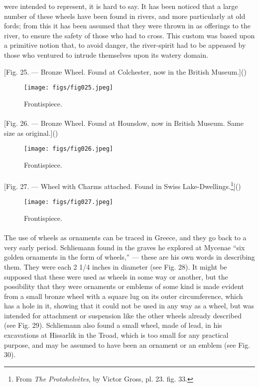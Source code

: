 \documentclass[a4paper, 11pt, oneside, polutonikogreek, english]{article}
\begin{document}
were intended to represent, it is hard to say. It has been noticed that a large number of these wheels have been found in rivers, and more particularly at old fords; from this it has been assumed that they were thrown in as offerings to the river, to ensure the safety of those who had to cross. This custom was based upon a primitive notion that, to avoid danger, the river-spirit had to be appeased by those who ventured to intrude themselves upon its watery domain.

[Fig. 25. --- Bronze Wheel. Found at Colchester, now in the British Museum.]()
\begin{figure}[H]
\centering
\texttt{[image: figs/fig025.jpeg]}
\caption{Frontispiece.}
\end{figure}
\paragraph{}
[Fig. 26. --- Bronze Wheel. Found at Hounslow, now in British Museum. Same size as original.]()
\begin{figure}[H]
\centering
\texttt{[image: figs/fig026.jpeg]}
\caption{Frontispiece.}
\end{figure}
\paragraph{}
[Fig. 27. --- Wheel with Charms attached. Found in Swiss Lake-Dwellings.\footnote{From \emph{The Protohelvètes}, by Victor Gross, pl. 23. fig. 33.}]()
\begin{figure}[H]
\centering
\texttt{[image: figs/fig027.jpeg]}
\caption{Frontispiece.}
\end{figure}
\paragraph{}
The use of wheels as ornaments can be traced in Greece, and they go back to a very early period. Schliemann found in the graves he explored at Mycenae ``six golden ornaments in the form of wheels,'' --- these are his own words in describing them. They were each 2 1/4 inches in diameter (see Fig. 28). It might be supposed that these were used as wheels in some way or another, but the possibility that they were ornaments or emblems of some kind is made evident from a small bronze wheel with a square lug on its outer circumference, which has a hole in it, showing that it could not be used in any way as a wheel, but was intended for attachment or suspension like the other wheels already described (see Fig. 29). Schliemann also found a small wheel, made of lead, in his excavations at Hissarlik in the Troad, which is too small for any practical purpose, and may be assumed to have been an ornament or an emblem (see Fig. 30).
\end{document}
